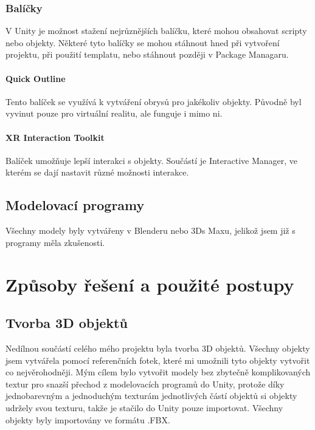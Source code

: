 \documentclass[12pt, a4paper,
twoside,        %
openright
]{report}
\begin{document}
\subsection{Balíčky}
V Unity je možnost stažení nejrůznějších balíčku, které mohou obsahovat scripty nebo objekty. Některé tyto balíčky se mohou stáhnout hned při vytvoření projektu, při použití templatu, nebo stáhnout později v Package Managaru.

\subsubsection{Quick Outline}
Tento balíček se využívá k vytváření obrysů pro jakékoliv objekty. Původně byl vyvinut pouze pro virtuální realitu, ale funguje i mimo ni. 


\subsubsection{XR Interaction Toolkit}
Balíček umožňuje lepší interakci s objekty. Součástí je Interactive Manager, ve kterém se dají nastavit různé možnosti interakce. 



\section{Modelovací programy}
\label{sec:modelovaci_programy}
Všechny modely byly vytvářeny v Blenderu nebo 3Ds Maxu, jelikož jsem již s programy měla zkušenosti. 




\chapter{Způsoby řešení a použité postupy}	
	
	
\section {Tvorba 3D objektů}
\label{sec:tvorba_3d_projektu}
Nedílnou součástí celého mého projektu byla tvorba 3D objektů. Všechny objekty jsem vytvářela pomocí referenčních fotek, které mi umožnili tyto objekty vytvořit co nejvěrohodněji. Mým cílem bylo vytvořit modely bez zbytečně komplikovaných textur pro snazší přechod z modelovacích programů do Unity, protože díky jednobarevným a jednoduchým texturám jednotlivých částí objektů si objekty udržely svou texturu, takže je stačilo do Unity pouze importovat. Všechny objekty byly importovány ve formátu .FBX.  	
	
\end{document}
